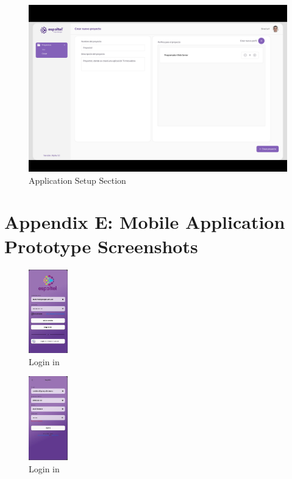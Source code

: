 \documentclass{scrreprt}
\begin{document}
\begin{figure}[H]
    \centering \small
    \includegraphics[width=1\textwidth]{WebPrototype/Director_flow4.png}
    \caption{Application Setup Section }
\end{figure} 



\section{Appendix E: Mobile Application Prototype Screenshots}
\begin{figure}[H] 
    
    \centering \small
    \includegraphics[width=0.15\textwidth]{MobilePrototype/LoginScreen.jpeg}
    \caption{Login in  }
\end{figure}

\begin{figure}[H]
    
    \centering \small
    \includegraphics[width=0.15\textwidth]{MobilePrototype/RegisterScreen.jpeg}
    \caption{Login in  }
\end{figure}
\end{document}
